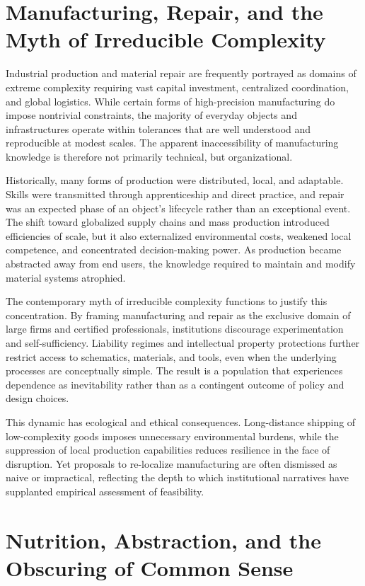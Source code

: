 \documentclass[12pt]{article}
\begin{document}
\section{Manufacturing, Repair, and the Myth of Irreducible Complexity}

Industrial production and material repair are frequently portrayed as domains of extreme complexity requiring vast capital investment, centralized coordination, and global logistics. While certain forms of high-precision manufacturing do impose nontrivial constraints, the majority of everyday objects and infrastructures operate within tolerances that are well understood and reproducible at modest scales. The apparent inaccessibility of manufacturing knowledge is therefore not primarily technical, but organizational.

Historically, many forms of production were distributed, local, and adaptable. Skills were transmitted through apprenticeship and direct practice, and repair was an expected phase of an object’s lifecycle rather than an exceptional event. The shift toward globalized supply chains and mass production introduced efficiencies of scale, but it also externalized environmental costs, weakened local competence, and concentrated decision-making power. As production became abstracted away from end users, the knowledge required to maintain and modify material systems atrophied.

The contemporary myth of irreducible complexity functions to justify this concentration. By framing manufacturing and repair as the exclusive domain of large firms and certified professionals, institutions discourage experimentation and self-sufficiency. Liability regimes and intellectual property protections further restrict access to schematics, materials, and tools, even when the underlying processes are conceptually simple. The result is a population that experiences dependence as inevitability rather than as a contingent outcome of policy and design choices.

This dynamic has ecological and ethical consequences. Long-distance shipping of low-complexity goods imposes unnecessary environmental burdens, while the suppression of local production capabilities reduces resilience in the face of disruption. Yet proposals to re-localize manufacturing are often dismissed as naive or impractical, reflecting the depth to which institutional narratives have supplanted empirical assessment of feasibility.

\section{Nutrition, Abstraction, and the Obscuring of Common Sense}
\end{document}
